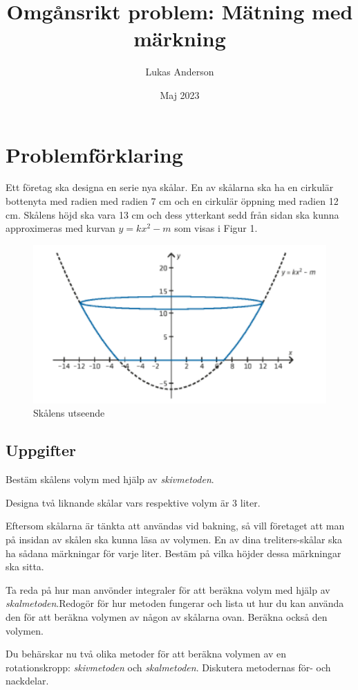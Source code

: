 \documentclass[12pt]{article}
\title{Omgånsrikt problem: Mätning med märkning}
\author{Lukas Anderson}
\date{Maj 2023}
\begin{document}
\maketitle

\section{Problemförklaring}
Ett företag ska designa en serie nya skålar. En av skålarna ska ha en cirkulär bottenyta med radien med radien 7 cm och en cirkulär öppning med radien 12 cm. Skålens höjd ska vara 13 cm och dess ytterkant sedd från sidan ska kunna approximeras med kurvan $y=kx^2-m$ som visas i Figur 1.

\begin{figure}[h]
    \centering
    \includegraphics[width=\textwidth]{figur1.png}
    \caption{Skålens utseende}
\end{figure}

\subsection*{Uppgifter}
\begin{list}{-}{\leftmargin=1em\rightmargin=1em}
    \item Bestäm skålens volym med hjälp av {\it skivmetoden}.
    \item Designa två liknande skålar vars respektive volym är 3 liter.
    \item Eftersom skålarna är tänkta att användas vid bakning, så vill företaget att man på insidan av skålen ska kunna läsa av volymen. En av dina treliters-skålar ska ha sådana märkningar för varje liter. Bestäm på vilka höjder dessa märkningar ska sitta.
    \item Ta reda på hur man anvönder integraler för att beräkna volym med hjälp av {\it skalmetoden}.Redogör för hur metoden fungerar och lista ut hur du kan använda den för att beräkna volymen av någon av skålarna ovan. Beräkna också den volymen.
    \item Du behärskar nu två olika metoder för att beräkna volymen av en rotationskropp: {\it skivmetoden\/} och {\it skalmetoden}. Diskutera metodernas för- och nackdelar.
\end{list}
\end{document}
